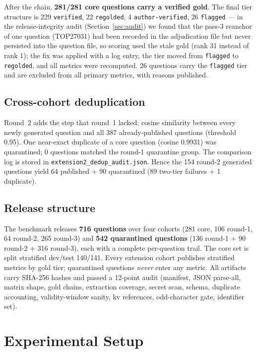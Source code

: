 \documentclass[10pt,a4paper,twocolumn]{article}
\newcommand{\code}[1]{\texttt{#1}}
\begin{document}
After the chain, \textbf{281/281 core questions carry a verified gold}. The final tier structure is 229 \code{verified}, 22 \code{regolded}, 4 \code{author-verified}, 26 \code{flagged} --- in the release-integrity audit (Section~\ref{sec:audit}) we found that the pass-3 reanchor of one question (TOP27031) had been recorded in the adjudication file but never persisted into the question file, so scoring used the stale gold (rank 31 instead of rank 1); the fix was applied with a log entry, the tier moved from \code{flagged} to \code{regolded}, and all metrics were recomputed. 26 questions carry the \code{flagged} tier and are excluded from all primary metrics, with reasons published.

\subsection{Cross-cohort deduplication}

Round~2 adds the step that round~1 lacked: cosine similarity between every newly generated question and all 387 already-published questions (threshold 0.95). One near-exact duplicate of a core question (cosine 0.9931) was quarantined; 0 questions matched the round-1 quarantine group. The comparison log is stored in \code{extension2\_dedup\_audit.json}. Hence the 154 round-2 generated questions yield 64 published + 90 quarantined (89 two-tier failures + 1 duplicate).

\subsection{Release structure}

The benchmark releases \textbf{716 questions} over four cohorts (281 core, 106 round-1, 64 round-2, 265 round-3) and \textbf{542 quarantined questions} (136 round-1 + 90 round-2 + 316 round-3), each with a complete per-question trail. The core set is split stratified dev/test 140/141. Every extension cohort publishes stratified metrics by gold tier; quarantined questions \emph{never} enter any metric. All artifacts carry SHA-256 hashes and passed a 12-point audit (manifest, JSON parse-all, matrix shape, gold chains, extraction coverage, secret scan, schema, duplicate accounting, validity-window sanity, kv references, odd-character gate, identifier set).

\section{Experimental Setup}
\end{document}
